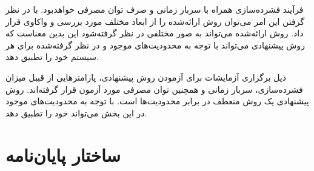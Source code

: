 فرآیند فشرده‌سازی همراه با سربار زمانی و صرف توان مصرفی خواهدبود. با در نظر گرفتن این امر می‌توان روش ارائه‌شده را از ابعاد مختلف مورد بررسی و واکاوی قرار داد. روش ارائه‌شده می‌تواند به صور مختلفی در نظر گرفته‌شود این بدین معناست که روش پیشنهادی می‌تواند با توجه به محدودیت‌های موجود و در نظر گرفته‌شده برای هر سیستم خود را تطبیق دهد.

ذیل برگزاری آزمایشات برای آزمودن روش پیشنهادی، پارامترهایی از قببل میزان فشرده‌سازی، سربار زمانی و همچنین توان مصرفی مورد آزمون قرار گرفته‌اند. روش پیشنهادی یک روش منعطف در برابر محدودیت‌ها است. با توجه به محدودیت‌های موجود در این بخش می‌تواند خود را تطبیق دهد.

\section{ساختار پایان‌نامه}